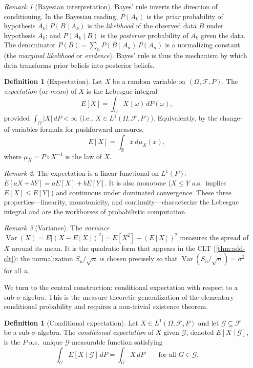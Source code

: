 \documentclass[12pt]{amsart}
\theoremstyle{definition}
\newtheorem{definition}[theorem]{Definition}
\theoremstyle{remark}
\newtheorem*{remark}{Remark}
\DeclareMathOperator{\Var}{Var}
\newcommand{\R}{\mathbb{R}}
\newcommand{\cF}{\mathcal{F}}
\begin{document}
\begin{remark}[Bayesian interpretation]
Bayes' rule inverts the direction of conditioning. In the Bayesian reading, $P(A_k)$ is the \emph{prior} probability of hypothesis $A_k$; $P(B \mid A_k)$ is the \emph{likelihood} of the observed data $B$ under hypothesis $A_k$; and $P(A_k \mid B)$ is the \emph{posterior} probability of $A_k$ given the data. The denominator $P(B) = \sum_n P(B \mid A_n)\, P(A_n)$ is a normalizing constant (the \emph{marginal likelihood} or \emph{evidence}). Bayes' rule is thus the mechanism by which data transforms prior beliefs into posterior beliefs.
\end{remark}

\begin{definition}[Expectation]\label{def:expectation}
Let $X$ be a random variable on $(\Omega, \cF, P)$. The \emph{expectation} (or \emph{mean}) of $X$ is the Lebesgue integral
\[
E[X] = \int_\Omega X(\omega)\, dP(\omega),
\]
provided $\int_\Omega |X|\, dP < \infty$ (i.e., $X \in L^1(\Omega, \cF, P)$). Equivalently, by the change-of-variables formula for pushforward measures,
\[
E[X] = \int_\R x\, d\mu_X(x),
\]
where $\mu_X = P \circ X^{-1}$ is the law of $X$.
\end{definition}

\begin{remark}
The expectation is a linear functional on $L^1(P)$: $E[aX + bY] = aE[X] + bE[Y]$. It is also monotone ($X \leq Y$ a.s.\ implies $E[X] \leq E[Y]$) and continuous under dominated convergence. These three properties---linearity, monotonicity, and continuity---characterize the Lebesgue integral and are the workhorses of probabilistic computation.
\end{remark}

\begin{remark}[Variance]
The \emph{variance} $\Var(X) = E\bigl[(X - E[X])^2\bigr] = E[X^2] - (E[X])^2$ measures the spread of $X$ around its mean. It is the quadratic form that appears in the CLT (\cref{thm:add-clt}): the normalization $S_n / \sqrt{n}$ is chosen precisely so that $\Var(S_n / \sqrt{n}) = \sigma^2$ for all $n$.
\end{remark}

We turn to the central construction: conditional expectation with respect to a sub-$\sigma$-algebra. This is the measure-theoretic generalization of the elementary conditional probability and requires a non-trivial existence theorem.

\begin{definition}[Conditional expectation]\label{def:cond-exp}
Let $X \in L^1(\Omega, \cF, P)$ and let $\mathcal{G} \subseteq \cF$ be a sub-$\sigma$-algebra. The \emph{conditional expectation} of $X$ given $\mathcal{G}$, denoted $E[X \mid \mathcal{G}]$, is the $P$-a.s.\ unique $\mathcal{G}$-measurable function satisfying
\begin{equation}\label{eq:cond-exp}
\int_G E[X \mid \mathcal{G}]\, dP = \int_G X\, dP \qquad \text{for all } G \in \mathcal{G}.
\end{equation}
\end{definition}
\end{document}
